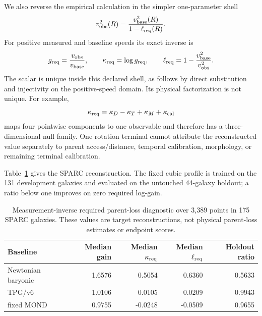 \documentclass[11pt]{article}
\begin{document}
We also reverse the empirical calculation in the simpler one-parameter shell
\begin{equation}
 v_{\rm obs}^{2}(R)=\frac{v_{\rm base}^{2}(R)}{1-\ell_{\rm req}(R)}.
 \label{eq:inverse-required-parent-loss-shell}
\end{equation}
For positive measured and baseline speeds its exact inverse is
\begin{equation}
 g_{\rm req}=\frac{v_{\rm obs}}{v_{\rm base}},\qquad
 \kappa_{\rm req}=\log g_{\rm req},\qquad
 \ell_{\rm req}=1-\frac{v_{\rm base}^{2}}{v_{\rm obs}^{2}}.
 \label{eq:inverse-required-parent-loss}
\end{equation}
The scalar is unique inside this declared shell, as follows by direct
substitution and injectivity on the positive-speed domain.  Its physical
factorization is not unique.  For example,
\begin{equation}
 \kappa_{\rm req}=\kappa_D-\kappa_T+\kappa_M+\kappa_{\rm cal}
 \label{eq:inverse-required-parent-loss-null}
\end{equation}
maps four pointwise components to one observable and therefore has a
three-dimensional null family.  One rotation terminal cannot attribute the
reconstructed value separately to parent access/distance, temporal
calibration, morphology, or remaining terminal calibration.

Table~\ref{tab:inverse-parent-loss} gives the SPARC reconstruction.  The fixed
cubic profile is trained on the 131 development galaxies and evaluated on the
untouched 44-galaxy holdout; a ratio below one improves on zero required
log-gain.

\begin{table}[htbp]
\centering
\caption{Measurement-inverse required parent-loss diagnostic over 3,389
points in 175 SPARC galaxies.  These values are target reconstructions, not
physical parent-loss estimates or endpoint scores.}
\label{tab:inverse-parent-loss}
\begin{tabular}{lrrrr}
\hline
Baseline & Median gain & Median $\kappa_{\rm req}$ & Median $\ell_{\rm req}$ & Holdout ratio\\
\hline
Newtonian baryonic & 1.6576 & 0.5054 & 0.6360 & 0.5633\\
TPG/v6 & 1.0106 & 0.0105 & 0.0209 & 0.9943\\
fixed MOND & 0.9755 & -0.0248 & -0.0509 & 0.9655\\
\hline
\end{tabular}
\end{table}
\end{document}
